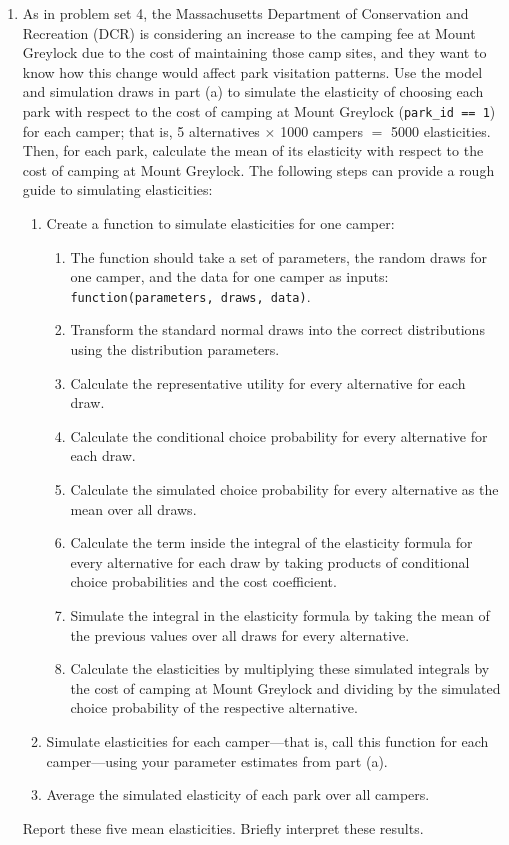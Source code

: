 \documentclass[11pt,letterpaper]{article}\usepackage[]{graphicx}\usepackage[]{xcolor}
\begin{document}
\begin{enumerate}[label=\alph*., leftmargin=*]
	\item As in problem set 4, the Massachusetts Department of Conservation and Recreation (DCR) is considering an increase to the camping fee at Mount Greylock due to the cost of maintaining those camp sites, and they want to know how this change would affect park visitation patterns. Use the model and simulation draws in part (a) to simulate the elasticity of choosing each park with respect to the cost of camping at Mount Greylock (\texttt{park\_id == 1}) for each camper; that is, 5 alternatives $\times$ 1000 campers $=$ 5000 elasticities. Then, for each park, calculate the mean of its elasticity with respect to the cost of camping at Mount Greylock. The following steps can provide a rough guide to simulating elasticities:
	\begin{enumerate}[label=\Roman*.]
		\item Create a function to simulate elasticities for one camper:
		\begin{enumerate}[label=\roman*.]
			\item The function should take a set of parameters, the random draws for one camper, and the data for one camper as inputs: \texttt{function(parameters, draws, data)}.
			\item Transform the standard normal draws into the correct distributions using the distribution parameters.
			\item Calculate the representative utility for every alternative for each draw.
			\item Calculate the conditional choice probability for every alternative for each draw.
			\item Calculate the simulated choice probability for every alternative as the mean over all draws.
			\item Calculate the term inside the integral of the elasticity formula for every alternative for each draw by taking products of conditional choice probabilities and the cost coefficient.
			\item Simulate the integral in the elasticity formula by taking the mean of the previous values over all draws for every alternative.
			\item Calculate the elasticities by multiplying these simulated integrals by the cost of camping at Mount Greylock and dividing by the simulated choice probability of the respective alternative.
		\end{enumerate}
		\item Simulate elasticities for each camper---that is, call this function for each camper---using your parameter estimates from part (a).
		\item Average the simulated elasticity of each park over all campers.
	\end{enumerate}
	Report these five mean elasticities. Briefly interpret these results.


\end{enumerate}
\end{document}
